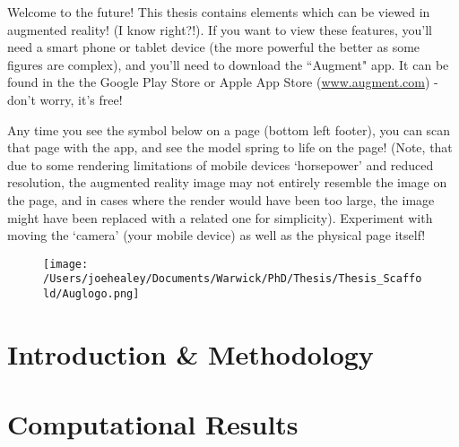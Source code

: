 \documentclass[a4paper, oneside, 11pt]{report} %
\begin{document}
Welcome to the future! This thesis contains elements which can be viewed in augmented reality! (I know right?!). If you want to view these features, you'll need a smart phone or tablet device (the more powerful the better as some figures are complex), and you'll need to download the ``Augment" app. It can be found in the the Google Play Store or Apple App Store (\url{www.augment.com}) - don't worry, it's free!

Any time you see the symbol below on a page (bottom left footer), you can scan that page with the app, and see the model spring to life on the page! (Note, that due to some rendering limitations of mobile devices `horsepower' and reduced resolution, the augmented reality image may not entirely resemble the image on the page, and in cases where the render would have been too large, the image might have been replaced with a related one for simplicity). Experiment with moving the `camera' (your mobile device) as well as the physical page itself!

\vspace{0.5cm}
\begin{figure}[h!]
\centering
    \texttt{[image: /Users/joehealey/Documents/Warwick/PhD/Thesis/Thesis\_Scaffold/Auglogo.png]}
\end{figure}

\newpage


\setcounter{page}{1}
\part{Introduction \& Methodology}

\newpage


\newpage

\part{Computational Results}

\newpage
\end{document}

